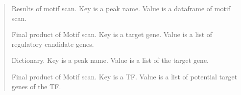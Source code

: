 \documentclass[letterpaper,10pt,english]{sphinxmanual}
\begin{document}
\begin{quote}
\begin{fulllineitems}

\begin{fulllineitems}
\label{\detokenize{modules/celloracle.motif_analysis:celloracle.motif_analysis.TFinfo.scanned_df}}
 \textendash{} Results of motif scan. Key is a peak name. Value is a dataframe of motif scan.

\end{fulllineitems}


\begin{fulllineitems}
\label{\detokenize{modules/celloracle.motif_analysis:celloracle.motif_analysis.TFinfo.dic_targetgene2TFs}}
 \textendash{} Final product of Motif scan. Key is a target gene. Value is a list of regulatory candidate genes.

\end{fulllineitems}


\begin{fulllineitems}
\label{\detokenize{modules/celloracle.motif_analysis:celloracle.motif_analysis.TFinfo.dic_peak2Targetgene}}
 \textendash{} Dictionary. Key is a peak name. Value is a list of the target gene.

\end{fulllineitems}


\begin{fulllineitems}
\label{\detokenize{modules/celloracle.motif_analysis:celloracle.motif_analysis.TFinfo.dic_TF2targetgenes}}
 \textendash{} Final product of Motif scan. Key is a TF. Value is a list of potential target genes of the TF.

\end{fulllineitems}



\end{fulllineitems}
\end{quote}
\end{document}
